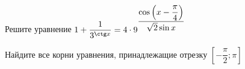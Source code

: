 \begin{ex}
	\begin{condition}
		\begin{enumcols}[label=\asbuk*)]
			\item Решите уравнение \( 1 + \dfrac{1}{3^{\ctg x} } = 4\cdot 9^{\dfrac{\cos{\left(x - \dfrac{\pi}{4}\right)}}{\sqrt{2}\sin x}} \)
			\item Найдите все корни уравнения, принадлежащие отрезку \( \left[-\dfrac{\pi}{2};\pi\right] \)
		\end{enumcols}
	\end{condition}
\end{ex}